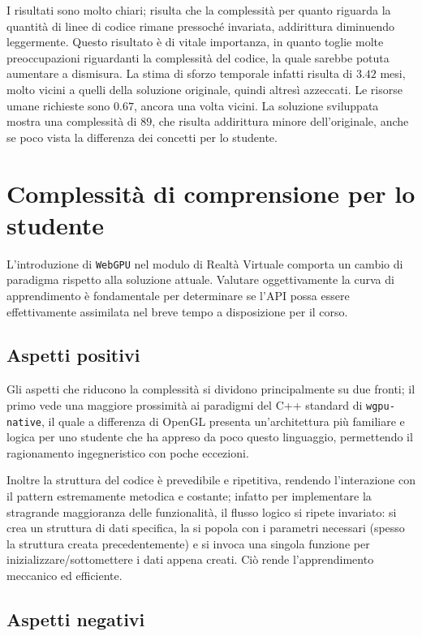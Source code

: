 \documentclass[a4paper, 11pt, twoside]{report}
\begin{document}
I risultati sono molto chiari; risulta che la complessità per quanto riguarda la quantità di linee di codice rimane
pressoché invariata, addirittura diminuendo leggermente. Questo risultato è di vitale importanza, in quanto toglie molte
preoccupazioni riguardanti la complessità del codice, la quale sarebbe potuta aumentare a dismisura.
La stima di sforzo temporale infatti risulta di $3.42$ mesi, molto vicini a quelli della soluzione originale, quindi
altresì azzeccati. Le risorse umane richieste sono $0.67$, ancora una volta vicini.
La soluzione sviluppata mostra una complessità di $89$, che risulta addirittura minore dell'originale,
anche se poco vista la differenza dei concetti per lo studente.

\section{Complessità di comprensione per lo studente}

L'introduzione di \texttt{WebGPU} nel modulo di Realtà Virtuale comporta un cambio di paradigma rispetto alla soluzione
attuale. Valutare oggettivamente la curva di apprendimento è fondamentale per determinare se l'API possa essere
effettivamente assimilata nel breve tempo a disposizione per il corso.

\subsection{Aspetti positivi}

Gli aspetti che riducono la complessità si dividono principalmente su due fronti; il primo vede una maggiore prossimità
ai paradigmi del C++ standard di \texttt{wgpu-native}, il quale a differenza di OpenGL presenta un'architettura più
familiare e logica per uno studente che ha appreso da poco questo linguaggio, permettendo il ragionamento ingegneristico
con poche eccezioni.

Inoltre la struttura del codice è prevedibile e ripetitiva, rendendo l'interazione con il pattern estremamente metodica
e costante; infatto per implementare la stragrande maggioranza delle funzionalità, il flusso logico si ripete invariato:
si crea un struttura di dati specifica, la si popola con i parametri necessari (spesso la struttura creata
precedentemente) e si invoca una singola funzione per inizializzare/sottomettere i dati appena creati. Ciò rende
l'apprendimento meccanico ed efficiente.

\subsection{Aspetti negativi}
\end{document}
